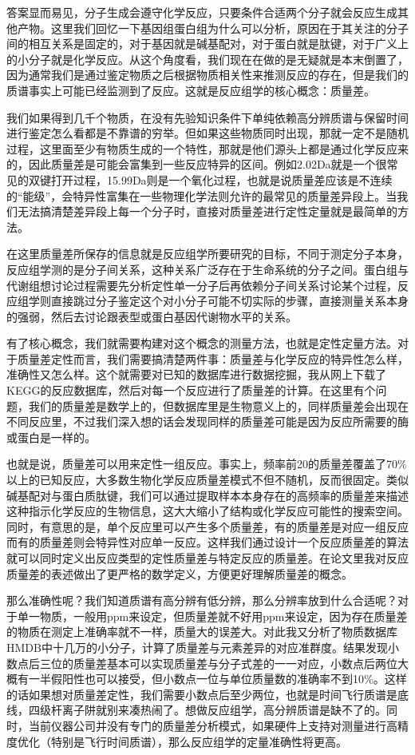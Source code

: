\documentclass[
]{book}
\begin{document}
答案显而易见，分子生成会遵守化学反应，只要条件合适两个分子就会反应生成其他产物。这里我们回忆一下基因组蛋白组为什么可以分析，原因在于其关注的分子间的相互关系是固定的，对于基因就是碱基配对，对于蛋白就是肽键，对于广义上的小分子就是化学反应。从这个角度看，我们现在在做的是无疑就是本末倒置了，因为通常我们是通过鉴定物质之后根据物质相关性来推测反应的存在，但是我们的质谱事实上可能已经监测到了反应。这就是反应组学的核心概念：质量差。

我们如果得到几千个物质，在没有先验知识条件下单纯依赖高分辨质谱与保留时间进行鉴定怎么看都是不靠谱的穷举。但如果这些物质同时出现，那就一定不是随机过程，这里面至少有物质生成的一个特性，那就是他们源头上都是通过化学反应来的，因此质量差是可能会富集到一些反应特异的区间。例如2.02Da就是一个很常见的双键打开过程，15.99Da则是一个氧化过程，也就是说质量差应该是不连续的``能级''，会特异性富集在一些物理化学法则允许的最常见的质量差异段上。当我们无法搞清楚差异段上每一个分子时，直接对质量差进行定性定量就是最简单的方法。

在这里质量差所保存的信息就是反应组学所要研究的目标，不同于测定分子本身，反应组学测的是分子间关系，这种关系广泛存在于生命系统的分子之间。蛋白组与代谢组想讨论过程需要先分析定性单一分子后再依赖分子间关系讨论某个过程，反应组学则直接跳过分子鉴定这个对小分子可能不切实际的步骤，直接测量关系本身的强弱，然后去讨论跟表型或蛋白基因代谢物水平的关系。

有了核心概念，我们就需要构建对这个概念的测量方法，也就是定性定量方法。对于质量差定性而言，我们需要搞清楚两件事：质量差与化学反应的特异性怎么样，准确性又怎么样。这个就需要对已知的数据库进行数据挖掘，我从网上下载了KEGG的反应数据库，然后对每一个反应进行了质量差的计算。在这里有个问题，我们的质量差是数学上的，但数据库里是生物意义上的，同样质量差会出现在不同反应里，不过我们深入想的话会发现同样的质量差可能是因为反应所需要的酶或蛋白是一样的。

也就是说，质量差可以用来定性一组反应。事实上，频率前20的质量差覆盖了70\%以上的已知反应，大多数生物化学反应质量差模式不但不随机，反而很固定。类似碱基配对与蛋白质肽键，我们可以通过提取样本本身存在的高频率的质量差来描述这种指示化学反应的生物信息，这大大缩小了结构或化学反应可能性的搜索空间。同时，有意思的是，单个反应里可以产生多个质量差，有的质量差是对应一组反应而有的质量差则会特异性对应单一反应。这样我们通过设计一个反应质量差的算法就可以同时定义出反应类型的定性质量差与特定反应的质量差。在论文里我对反应质量差的表述做出了更严格的数学定义，方便更好理解质量差的概念。

那么准确性呢？我们知道质谱有高分辨有低分辨，那么分辨率放到什么合适呢？对于单一物质，一般用ppm来设定，但质量差就不好用ppm来设定，因为存在质量差的物质在测定上准确率就不一样，质量大的误差大。对此我又分析了物质数据库HMDB中十几万的小分子，计算了质量差与元素差异的对应准群度。结果发现小数点后三位的质量差基本可以实现质量差与分子式差的一一对应，小数点后两位大概有一半假阳性也可以接受，但小数点一位与单位质量数的准确率不到10\%。这样的话如果想对质量差定性，我们需要小数点后至少两位，也就是时间飞行质谱是底线，四级杆离子阱就别来凑热闹了。想做反应组学，高分辨质谱是缺不了的。同时，当前仪器公司并没有专门的质量差分析模式，如果硬件上支持对测量进行高精度优化（特别是飞行时间质谱），那么反应组学的定量准确性将更高。
\end{document}
